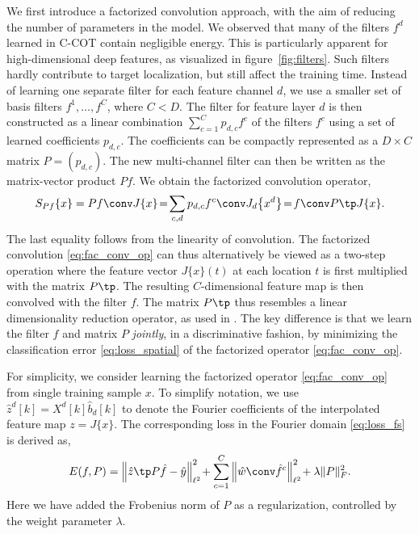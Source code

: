 \documentclass[10pt,twocolumn,letterpaper]{article}
\begin{document}
We first introduce a factorized convolution approach, with the aim of reducing the number of parameters in the model. We observed that many of the filters $f^d$ learned in C-COT contain negligible energy. This is particularly apparent for high-dimensional deep features, as visualized in figure~\ref{fig:filters}. Such filters hardly contribute to target localization, but still affect the training time. Instead of learning one separate filter for each feature channel $d$, we use a smaller set of basis filters $f^1, \ldots, f^C$, where $C < D$. The filter for feature layer $d$ is then constructed as a linear combination $\sum_{c=1}^C p_{d,c} f^c$ of the filters $f^c$ using a set of learned coefficients $p_{d,c}$. The coefficients can be compactly represented as a $D \times C$ matrix $P = (p_{d,c})$. The new multi-channel filter can then be written as the matrix-vector product $P f$. We obtain the factorized convolution operator,
\begin{equation}
\label{eq:fac_conv_op}
S_{Pf}\{x\} = Pf \conv J \{x\} \! = \! \sum_{c,d} p_{d,c} f^c \conv J_d \big\{x^d\big\} \! = \! f \conv P\tp J \{x\}.
\end{equation}
The last equality follows from the linearity of convolution. The factorized convolution \eqref{eq:fac_conv_op} can thus alternatively be viewed as a two-step operation where the feature vector $J \{x\}(t)$ at each location $t$ is first multiplied with the matrix $P\tp$. The resulting $C$-dimensional feature map is then convolved with the filter $f$. The matrix $P\tp$ thus resembles a linear dimensionality reduction operator, as used in \eg \cite{DanelljanCVPR14}. The key difference is that we learn the filter $f$ and matrix $P$ \emph{jointly}, in a discriminative fashion, by minimizing the classification error \eqref{eq:loss_spatial} of the factorized operator \eqref{eq:fac_conv_op}. 

For simplicity, we consider learning the factorized operator \eqref{eq:fac_conv_op} from single training sample $x$. To simplify notation, we use $\hat{z}^d[k] = X^d[k] \hat{b}_d[k]$ to denote the Fourier coefficients of the interpolated feature map $z = J\{x\}$. The corresponding loss in the Fourier domain \eqref{eq:loss_fs} is derived as,
\begin{equation}
	\label{eq:loss_fac}
	E(f,P) = \left\|\hat{z}\tp P \hat{f} - \hat{y}\right\|^2_{\ell^2} \! + \sum_{c=1}^{C} \left\|\hat{w} \conv \hat{f}^c \right\|^2_{\ell^2} \! + \lambda \|P\|_F^2 .
\end{equation}
Here we have added the Frobenius norm of $P$ as a regularization, controlled by the weight parameter $\lambda$.
\end{document}
